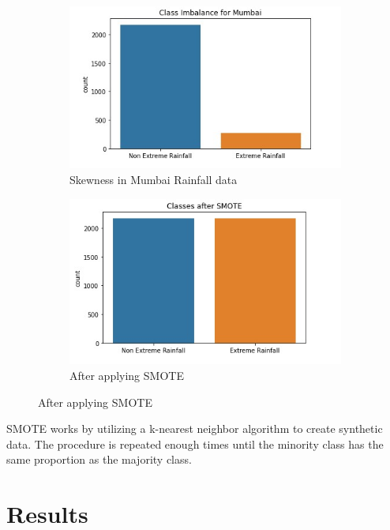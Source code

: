 \documentclass[11pt,a4paper]{article}
\begin{document}
\begin{figure}[!h]
\begin{subfigure}{.5\textwidth}
\centering
\includegraphics[width=\linewidth]{Fig3.jpeg}
\caption{Skewness in Mumbai Rainfall data}
\end{subfigure}%
\begin{subfigure}{.5\textwidth}
\centering
\includegraphics[width=\linewidth]{fig4.jpeg}
\caption{After applying SMOTE}
\end{subfigure}
\end{figure}

SMOTE works by utilizing a k-nearest neighbor algorithm to create synthetic data. The procedure is repeated enough times until the minority class has the same proportion as the majority class.

\section{Results}
\end{document}
